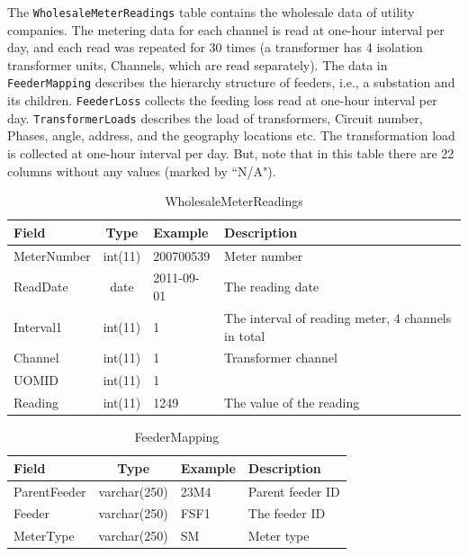 \documentclass[a4paper,12pt]{llncs}
\newcommand{\ie}{i.e.}
\begin{document}
 The \texttt{WholesaleMeterReadings} table contains the wholesale data of utility companies. The metering data for each channel is read at one-hour interval per day, and each read was repeated for 30 times (a transformer has 4 isolation transformer units, Channels, which are read separately). The data in \texttt{FeederMapping}  describes the hierarchy structure of feeders, \ie, a substation and its children.  \texttt{FeederLoss} collects the  feeding loss read at one-hour interval per day.  \texttt{TransformerLoads}  describes the load of transformers, Circuit number, Phases, angle, address, and the geography locations etc. The transformation load is collected at one-hour interval per day. But, note that in this table there are 22 columns without any values (marked by ``N/A").


\begin{table}[htp]
\centering
\caption{WholesaleMeterReadings}
\begin{tabular}{|l|c|l|p{10cm}|}
 \hline
 {\bf Field}       & {\bf Type} & {\bf Example}     & {\bf Description } \\ \hline
MeterNumber&int(11)& 200700539 & Meter number  \\ \hline
ReadDate   &date   & 2011-09-01 & The reading date  \\ \hline
Interval1  &int(11)& 1 & The interval of reading meter, 4 channels in total  \\ \hline
Channel    &int(11)& 1 & Transformer channel  \\ \hline
UOMID      &int(11)& 1 &   \\ \hline
Reading    &int(11)& 1249 &  The value of the reading \\ \hline
\end{tabular}
\end{table}


\begin{table}[htp]
\centering
\caption{FeederMapping}
\begin{tabular}{|l|c|l|p{9.2cm}|}
 \hline
 {\bf Field}       & {\bf Type} & {\bf Example}     & {\bf Description } \\ \hline
ParentFeeder&varchar(250)&23M4  & Parent feeder ID  \\ \hline
Feeder      &varchar(250)&FSF1  & The feeder ID  \\ \hline
MeterType   &varchar(250)& SM &  Meter type \\  \hline
\end{tabular}
\end{table}
\end{document}
